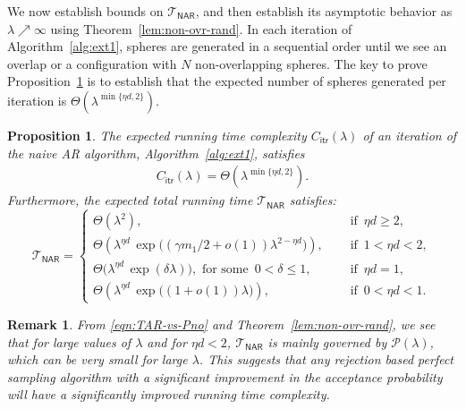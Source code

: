 \documentclass[11pt]{article}
\newcommand{\lt}{\left}
\newcommand{\rt}{\right}
\newcommand{\pno}{\mathcal{P}(\lambda)}
\newcommand{\comAR}{\mathcal{T}_{\mathsf{NAR}}}
\newtheorem{proposition}{Proposition}
\newtheorem{remark}{Remark}
\begin{document}
We now establish bounds on ${\mathcal{T}}_{\mathsf{NAR}}$,
and then establish its asymptotic behavior as $\lambda \nearrow \infty$ using Theorem~\ref{lem:non-ovr-rand}. In each iteration of Algorithm~\ref{alg:ext1},  spheres are generated in a sequential order until we see an overlap or a configuration with $N$ non-overlapping spheres. 
The key to prove Proposition~\ref{prop:AR_meth} is to establish that the expected number of spheres generated per iteration is $\Theta\lt(\lambda^{\min\{\eta d, 2 \}}\rt)$.
\begin{proposition}
\label{prop:AR_meth}
The expected running time complexity $C_{\mathsf{itr}}(\lambda)$ of an iteration of the naive AR algorithm, Algorithm~\ref{alg:ext1}, satisfies
\begin{align}
\label{eqn:TAR-vs-Pno}
C_{\mathsf{itr}}(\lambda) = \Theta\lt( \lambda^{\min\{\eta d, 2 \}}\rt).
\end{align}
Furthermore, the expected total running time $\comAR$ satisfies:
\[
 \comAR = \begin{cases}
 \Theta\lt(\lambda^{2}\rt), & \quad \text{ if }\, \eta d \geq 2,\\
 \Theta\lt(\lambda^{\eta d}\,\exp\Big(\lt(\gamma m_1/2 +o(1)\rt)\lambda^{2 - \eta d }\Big)\rt), & \quad \text{ if }\, 1 < \eta d < 2,\\
 \Theta\Big(\lambda^{\eta d}\, \exp\lt(\delta\lambda\rt)\Big), \text{ for some }\, 0 < \delta \leq  1,& \quad\text{ if }\,\eta d = 1,\\
 \Theta\lt( \lambda^{\eta d}\, \exp\Big((1 + o(1))\lambda\Big)\rt),& \quad \text{ if }\,0 < \eta d < 1.
 \end{cases}
\]
\end{proposition}

\begin{remark}
 From \eqref{eqn:TAR-vs-Pno} and Theorem~\ref{lem:non-ovr-rand}, we see that for large values of $\lambda$ and for $\eta d < 2$, $\comAR$  is mainly governed by $\pno$, which can be very small for large $\lambda$. This suggests that any rejection based perfect sampling algorithm with a significant improvement in the acceptance probability will have a significantly improved running time complexity.
\end{remark}
\end{document}
